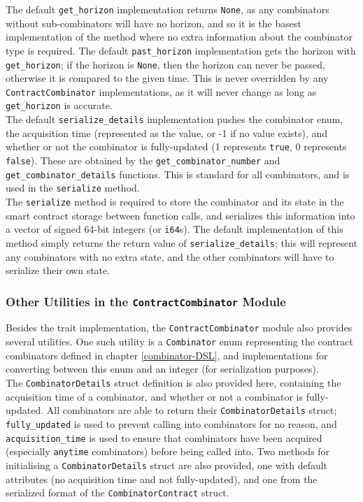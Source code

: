 The default \texttt{get\_horizon} implementation returns \texttt{None}, as any combinators without sub-combina\-tors will have no horizon, and so it is the basest implementation of the method where no extra information about the combinator type is required. The default \texttt{past\_horizon} implementation gets the horizon with \texttt{get\_horizon}; if the horizon is \texttt{None}, then the horizon can never be passed, otherwise it is compared to the given time. This is never overridden by any \texttt{ContractCombinator} implementations, as it will never change as long as \texttt{get\_horizon} is accurate. \\

The default \texttt{serialize\_details} implementation pushes the combinator enum, the acquisition time (represented as the value, or -1 if no value exists), and whether or not the combinator is fully-updated (1 represents \texttt{true}, 0 represents \texttt{false}). These are obtained by the \texttt{get\_combinator\_number} and \texttt{get\_combinator\_details} functions. This is standard for all combinators, and is used in the \texttt{serialize} method. \\

The \texttt{serialize} method is required to store the combinator and its state in the smart contract storage between function calls, and serializes this information into a vector of signed 64-bit integers (or \texttt{i64}s). The default implementation of this method simply returns the return value of \texttt{serialize\_details}; this will represent any combinators with no extra state, and the other combinators will have to serialize their own state.


\subsubsection{Other Utilities in the \texttt{ContractCombinator} Module}

Besides the trait implementation, the \texttt{ContractCombinator} module also provides several utilities. One such utility is a \texttt{Combinator} enum representing the contract combinators defined in chapter \ref{combinator-DSL}, and implementations for converting between this enum and an integer (for serialization purposes). \\

The \texttt{CombinatorDetails} struct definition is also provided here, containing the acquisition time of a combinator, and whether or not a combinator is fully-updated. All combinators are able to return their \texttt{CombinatorDetails} struct; \texttt{fully\_updated} is used to prevent calling into combinators for no reason, and \texttt{acquisition\_time} is used to ensure that combinators have been acquired (especially \texttt{anytime} combinators) before being called into. Two methods for initialising a \texttt{CombinatorDetails} struct are also provided, one with default attributes (no acquisition time and not fully-updated), and one from the serialized format of the \texttt{CombinatorContract} struct. \\


